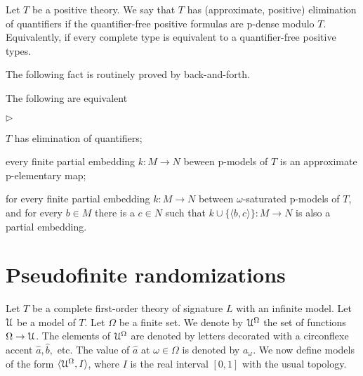 \documentclass[10pt,oneside]{amsproc}
\newcommand{\mylabel}[1]{{#1}\hfill}
\renewenvironment{itemize}
  {\begin{list}{$\triangleright$}{%
  \setlength{\parskip}{0mm}
  \setlength{\topsep}{.4\baselineskip}
  \setlength{\rightmargin}{0mm}
  \setlength{\listparindent}{0mm}
  \setlength{\itemindent}{0mm}
  \setlength{\labelwidth}{3ex}
  \setlength{\itemsep}{.2\baselineskip}
  \setlength{\parsep}{.2\baselineskip}
  \setlength{\partopsep}{0mm}
  \setlength{\labelsep}{1ex}
  \setlength{\leftmargin}{\labelwidth+\labelsep}
  \let\makelabel\mylabel}}{%
\end{list}}
\begin{document}
{Let $T$ be a positive theory.
We say that $T$ has (approximate, positive) elimination of quantifiers if the quantifier-free positive formulas are p-dense modulo $T$.
Equivalently, if every complete type is equivalent to a quantifier-free positive types.


The following fact is routinely proved by back-and-forth.

\begin{fact}\label{fact_backandforth}
  The following are equivalent
  \begin{itemize}
    \item[1.] $T$ has elimination of quantifiers;
    \item[2.] every finite partial embedding $k:M\to N$ beween p-models of $T$ is an approximate p-elementary map;
    \item[3.]  for every finite partial embedding $k:M\to N$ between $\omega$-saturated p-models of $T$, and for every $b\in M$ there is a $c\in N$ such that $k\cup\{\langle b,c\rangle\}:M\to N$ is also a partial embedding.
  \end{itemize}
\end{fact}



\section{Pseudofinite randomizations}

\def\ceq#1#2#3{\parbox[t]{25ex}{$\displaystyle #1$}\parbox[t]{6ex}{$\displaystyle\hfil #2$}{$\displaystyle #3$}}

Let $T$ be a complete first-order theory of signature $L$ with an infinite model.
Let ${\EuScript U}$ be a model of $T$.
Let $\Omega$ be a finite set.
We denote by ${\EuScript U}^\Omega$ the set of functions $\Omega\to{\EuScript U}$.
The elements of ${\EuScript U}^\Omega$ are denoted by letters decorated with a circonflexe accent $\hat a,\hat b,$ etc.
The value of $\hat a$ at $\omega\in\Omega$ is denoted by $a_\omega$.
We now define models of the form $\langle{\EuScript U}^\Omega, I\rangle$, where $I$ is the real interval $[0,1]$ with the usual topology.

}
\end{document}

